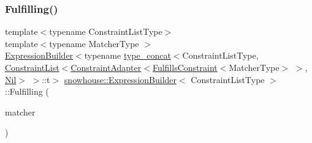 \mbox{\label{structsnowhouse_1_1ExpressionBuilder_a3d8e6eb7428cbe0e5788b69da47099fa}} 
\subsubsection{\texorpdfstring{Fulfilling()}{Fulfilling()}}
{\footnotesize\ttfamily template$<$typename Constraint\+List\+Type$>$ \\
template$<$typename Matcher\+Type $>$ \\
\mbox{\hyperlink{structsnowhouse_1_1ExpressionBuilder}{Expression\+Builder}}$<$typename \mbox{\hyperlink{structsnowhouse_1_1type__concat}{type\+\_\+concat}}$<$Constraint\+List\+Type, \mbox{\hyperlink{structsnowhouse_1_1ConstraintList}{Constraint\+List}}$<$\mbox{\hyperlink{structsnowhouse_1_1ConstraintAdapter}{Constraint\+Adapter}}$<$\mbox{\hyperlink{structsnowhouse_1_1FulfillsConstraint}{Fulfills\+Constraint}}$<$Matcher\+Type$>$ $>$, \mbox{\hyperlink{structsnowhouse_1_1Nil}{Nil}}$>$ $>$\+::t$>$ \mbox{\hyperlink{structsnowhouse_1_1ExpressionBuilder}{snowhouse\+::\+Expression\+Builder}}$<$ Constraint\+List\+Type $>$\+::Fulfilling (\begin{DoxyParamCaption}\item[{const Matcher\+Type \&}]{matcher }\end{DoxyParamCaption})\hspace{0.3cm}{\ttfamily [inline]}}

\mbox{\label{structsnowhouse_1_1ExpressionBuilder_a8f184e5dc6b985e01a0b41a9a7312a60}} 
